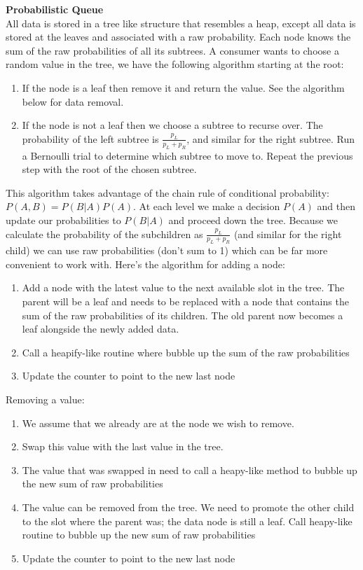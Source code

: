 \documentclass[12pt]{article}
\begin{document}
\textbf{Probabilistic Queue} \\
All data is stored in a tree like structure that resembles a heap, except all data is stored at the leaves and associated with a raw probability.  Each node knows the sum of the raw probabilities of all its subtrees.  A consumer wants to choose a random value in the tree, we have the following algorithm starting at the root:
\begin{enumerate}
	\item If the node is a leaf then remove it and return the value.  See the algorithm below for data removal.  
	\item If the node is not a leaf then we choose a subtree to recurse over.  The probability of the left subtree is $\frac{p_L}{p_L + p_R}$, and similar for the right subtree.  Run a Bernoulli trial to determine which subtree to move to.  Repeat the previous step with the root of the chosen subtree.  
\end{enumerate}

This algorithm takes advantage of the chain rule of conditional probability: $P(A,B) = P(B|A)P(A)$.  At each level we make a decision $P(A)$ and then update our probabilities to $P(B|A)$ and proceed down the tree.  Because we calculate the probability of the subchildren as $\frac{p_L}{p_L + p_R}$ (and similar for the right child) we can use raw probabilities (don't sum to 1) which can be far more convenient to work with.  Here's the algorithm for adding a node:
\begin{enumerate}
	\item Add a node with the latest value to the next available slot in the tree.  The parent will be a leaf and needs to be replaced with a node that contains the sum of the raw probabilities of its children.  The old parent now becomes a leaf alongside the newly added data.  
	\item Call a heapify-like routine where bubble up the sum of the raw probabilities
	\item Update the counter to point to the new last node
\end{enumerate}

Removing a value:
\begin{enumerate}
	\item We assume that we already are at the node we wish to remove.  
	\item Swap this value with the last value in the tree.  
	\item The value that was swapped in need to call a heapy-like method to bubble up the new sum of raw probabilities
	\item The value can be removed from the tree.  We need to promote the other child to the slot where the parent was; the data node is still a leaf.  Call heapy-like routine to bubble up the new sum of raw probabilities
	\item Update the counter to point to the new last node
\end{enumerate}
\end{document}
